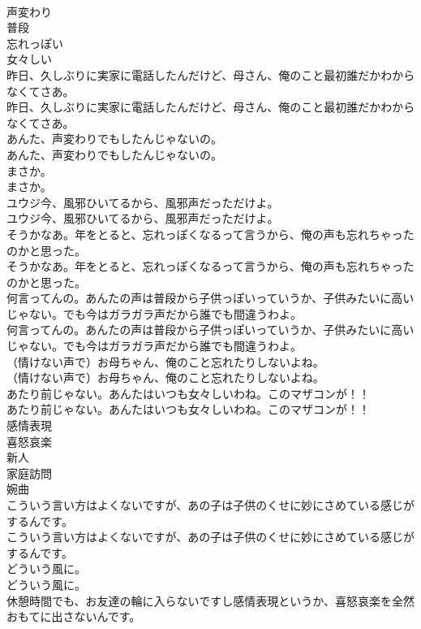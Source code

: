 \documentclass[8pt]{extreport}
\begin{document}
\begin{CJK}{UTF8}{min}
\\	声変わり
\\	普段
\\	忘れっぽい
\\	女々しい
\\	昨日、久しぶりに実家に電話したんだけど、母さん、俺のこと最初誰だかわからなくてさあ。	
\\	昨日、久しぶりに実家に電話したんだけど、母さん、俺のこと最初誰だかわからなくてさあ。 
\\	あんた、声変わりでもしたんじゃないの。	
\\	あんた、声変わりでもしたんじゃないの。 
\\	まさか。	
\\	まさか。 
\\	ユウジ今、風邪ひいてるから、風邪声だっただけよ。	
\\	ユウジ今、風邪ひいてるから、風邪声だっただけよ。 
\\	そうかなあ。年をとると、忘れっぽくなるって言うから、俺の声も忘れちゃったのかと思った。	
\\	そうかなあ。年をとると、忘れっぽくなるって言うから、俺の声も忘れちゃったのかと思った。 
\\	何言ってんの。あんたの声は普段から子供っぽいっていうか、子供みたいに高いじゃない。でも今はガラガラ声だから誰でも間違うわよ。	
\\	何言ってんの。あんたの声は普段から子供っぽいっていうか、子供みたいに高いじゃない。でも今はガラガラ声だから誰でも間違うわよ。 
\\	（情けない声で）お母ちゃん、俺のこと忘れたりしないよね。	
\\	（情けない声で）お母ちゃん、俺のこと忘れたりしないよね。 
\\	あたり前じゃない。あんたはいつも女々しいわね。このマザコンが！！	
\\	あたり前じゃない。あんたはいつも女々しいわね。このマザコンが！！ 
\\	感情表現
\\	喜怒哀楽
\\	新人
\\	家庭訪問
\\	婉曲
\\	こういう言い方はよくないですが、あの子は子供のくせに妙にさめている感じがするんです。	
\\	こういう言い方はよくないですが、あの子は子供のくせに妙にさめている感じがするんです。 
\\	どういう風に。	
\\	どういう風に。 
\\	休憩時間でも、お友達の輪に入らないですし感情表現というか、喜怒哀楽を全然おもてに出さないんです。	

\end{CJK}
\end{document}
